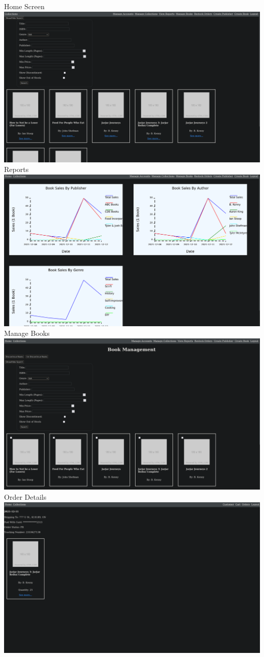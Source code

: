 \documentclass{article}
\begin{document}
\begin{center}
  Home Screen
  \includegraphics[width=\textwidth]{home_screen}
  Reports
  \includegraphics[width=\textwidth]{reports}
  Manage Books
  \includegraphics[width=\textwidth]{manage_books}
  Order Details
  \includegraphics[width=\textwidth]{order}

\end{center}
\end{document}
